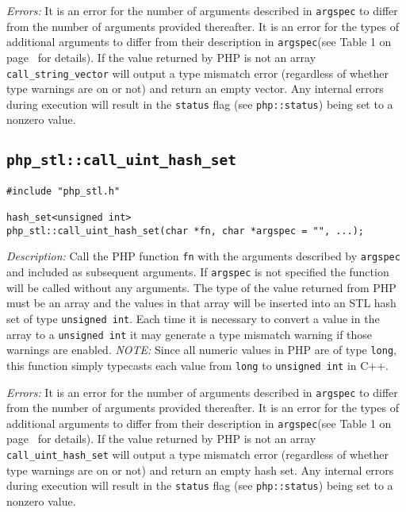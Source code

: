 \documentclass[11pt,titlepage]{article}
\begin{document}
\emph{Errors:} It is an error for the number of arguments described in \verb|argspec| to differ from the number of arguments provided thereafter. It is an error for the types of additional arguments to differ from their description in \verb|argspec|(see Table 1 on page~\pageref{Table1} for details). If the value returned by PHP is not an array \verb|call_string_vector| will output a type mismatch error (regardless of whether type warnings are on or not) and return an empty vector. Any internal errors during execution will result in the \verb|status| flag (see \verb|php::status|) being set to a nonzero value.


\subsection{\texttt{php\_stl::call\_uint\_hash\_set}}

\begin{verbatim}
#include "php_stl.h"

hash_set<unsigned int> 
php_stl::call_uint_hash_set(char *fn, char *argspec = "", ...);
\end{verbatim}

\emph{Description:} Call the PHP function \verb|fn| with the arguments described by \verb|argspec| and included as subsequent arguments. If \verb|argspec| is not specified the function will be called without any arguments. The type of the value returned from PHP must be an array and the values in that array will be inserted into an STL hash set of type \verb|unsigned int|. Each time it is necessary to convert a value in the array to a \verb|unsigned int| it may generate a type mismatch warning if those warnings are enabled. \emph{NOTE:} Since all numeric values in PHP are of type \verb|long|, this function simply typecasts each value from \verb|long| to \verb|unsigned int| in C++.

\emph{Errors:} It is an error for the number of arguments described in \verb|argspec| to differ from the number of arguments provided thereafter. It is an error for the types of additional arguments to differ from their description in \verb|argspec|(see Table 1 on page~\pageref{Table1} for details). If the value returned by PHP is not an array \verb|call_uint_hash_set| will output a type mismatch error (regardless of whether type warnings are on or not) and return an empty hash set. Any internal errors during execution will result in the \verb|status| flag (see \verb|php::status|) being set to a nonzero value.
\end{document}
